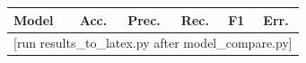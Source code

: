 \begin{tabular}{lccccc}
\hline
Model & Acc. & Prec. & Rec. & F1 & Err. \\
\hline
\multicolumn{6}{c}{[run results\_to\_latex.py after model\_compare.py]} \\
\hline
\end{tabular}
